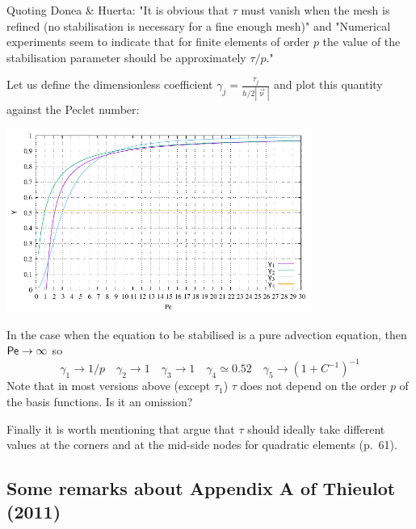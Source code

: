 Quoting Donea \& Huerta: "It is obvious that $\tau$ must vanish when the mesh is refined (no stabilisation
is necessary for a fine enough mesh)" and "Numerical experiments seem to indicate that for 
finite elements of order $p$ the value of the stabilisation parameter should be approximately 
$\tau/p$."

Let us define the dimensionless coefficient 
$\gamma_j=\frac{\tau_j}{h/2|\vec\upnu|}$ and 
plot this quantity against the Peclet number:

\begin{center}
\includegraphics[width=10cm]{images/supg/gamma} 
\end{center}

In the case when the equation to be stabilised is a pure advection equation, 
then ${\mathsf{Pe}}\rightarrow \infty$ so 
\[
\gamma_1 \rightarrow 1/p  \quad
\gamma_2 \rightarrow 1 \quad
\gamma_3 \rightarrow 1 \quad
\gamma_4 \simeq 0.52 \quad
\gamma_5 \rightarrow (1+C^{-1})^{-1} 
\]
Note that in most versions above (except $\tau_1$) 
$\tau$ does not depend on the order $p$ of the basis functions.
Is it an omission?

Finally it is worth mentioning that \textcite{dohu03} argue that $\tau$ should 
ideally take different values at the corners and at the mid-side nodes for quadratic elements (p.~61).

\subsection{Some remarks about Appendix A of Thieulot (2011) \cite{thie11}}
\label{ss:appAthie11}

